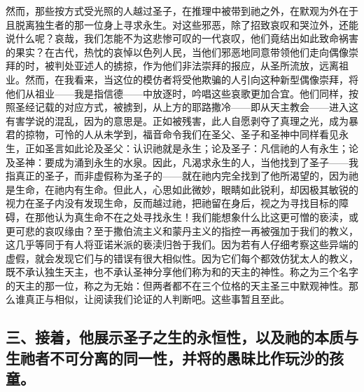 然而，那些按方式受光照的人越过圣子，在推理中被带到祂之外，在默观为外在于且脱离独生者的那一位身上寻求永生。对这些邪恶，除了招致哀叹和哭泣外，还能说什么呢？哀哉，我们怎能不为这悲惨可叹的一代哀叹，他们竟结出如此致命祸害的果实？在古代，热忱的哀悼以色列人民，当他们邪恶地同意带领他们走向偶像崇拜的时，被判处亚述人的掳掠，作为他们非法崇拜的报应，从圣所流放，远离祖业。然而，在我看来，当这位的模仿者将受他欺骗的人引向这种新型偶像崇拜，将他们从祖业——我是指信德——中放逐时，吟唱这些哀歌更加合宜。他们同样，按照圣经记载的对应方式，被掳到，从上方的耶路撒冷——即从天主教会——进入这有害学说的混乱，因为的意思是。正如被残害，此人自愿剥夺了真理之光，成为暴君的掠物，可怜的人从未学到，福音命令我们在圣父、圣子和圣神中同样看见永生，正如圣言如此论及圣父：认识祂就是永生；论及圣子：凡信祂的人有永生；论及圣神：要成为涌到永生的水泉。因此，凡渴求永生的人，当他找到了圣子——我指真正的圣子，而非虚假称为圣子的——就在祂内完全找到了他所渴望的，因为祂是生命，在祂内有生命。但此人，心思如此微妙，眼睛如此锐利，却因极其敏锐的视力在圣子内没有发现生命，反而越过祂，把祂留在身后，视之为寻找目标的障碍，在那他认为真生命不在之处寻找永生！我们能想象什么比这更可憎的亵渎，或更可悲的哀叹缘由？至于撒伯流主义和蒙丹主义的指控一再被强加于我们的教义，这几乎等同于有人将亚诺米派的亵渎归咎于我们。因为若有人仔细考察这些异端的虚假，就会发现它们与的错误有很大相似性。因为它们每个都效仿犹太人的教义，既不承认独生天主，也不承认圣神分享他们称为和的天主的神性。称之为三个名字的天主的那一位，称之为无始：但两者都不在三个位格的天主圣三中默观神性。那么谁真正与相似，让阅读我们论证的人判断吧。这些事暂且至此。\par


\subsection{三、接着，他展示圣子之生的永恒性，以及祂的本质与生祂者不可分离的同一性，并将的愚昧比作玩沙的孩童。}

